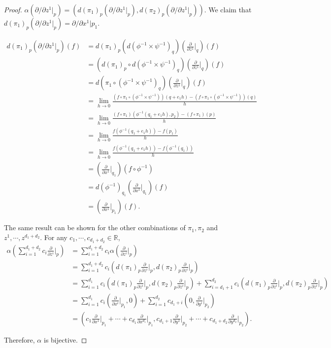\begin{proof}
  $\alpha(\partial / \partial z^1 \vert_p) = (d(\pi_1)_p(\partial/\partial z^1\vert_p), d(\pi_2)_p(\partial/\partial z^1\vert_p))$.
  We claim that $d(\pi_1)_p(\partial / \partial z^1 \vert_p) = \partial / \partial x^1 \vert p_1$.

  \begin{align*}
    d(\pi_1)_p(\partial / \partial z^1 \vert_p)(f)
      &= d(\pi_1)_p(d(\phi^{-1} \times \psi^{-1})_q)(\frac{\partial}{\partial z^1}\vert_q) (f)\\
      &= (d(\pi_1)_p \circ d(\phi^{-1} \times \psi^{-1})_q)(\frac{\partial}{\partial z^1}\vert_q) (f)\\
      &= d(\pi_1 \circ (\phi^{-1} \times \psi^{-1})_q)(\frac{\partial}{\partial z^1}\vert_q) (f)\\
      &= \lim_{h \rightarrow 0} \frac{(f \circ \pi_1 \circ (\phi^{-1} \times \psi^{-1}))(q + e_1h) - (f \circ \pi_1 \circ (\phi^{-1} \times \psi^{-1}))(q)}{h} \\
      &= \lim_{h \rightarrow 0} \frac{(f \circ \pi_1)(\phi^{-1}(q_1 + e_1h), p_2) - (f \circ \pi_1)(p)}{h} \\
      &= \lim_{h \rightarrow 0} \frac{f(\phi^{-1}(q_1 + e_1h)) - f(p_1)}{h} \\
      &= \lim_{h \rightarrow 0} \frac{f(\phi^{-1}(q_1 + e_1h)) - f(\phi^{-1}(q_1))}{h} \\
      &= (\frac{\partial}{\partial x^1}\vert_{q_1})(f \circ \phi^{-1}) \\
      &= d(\phi^{-1})_{q_1}(\frac{\partial}{\partial x^1}\vert_{q_1})(f) \\
      &= (\frac{\partial}{\partial x^1}\vert_{p_1})(f).
  \end{align*}

  The same result can be shown for the other combinations of $\pi_1, \pi_2$ and $z^1, \cdots, z^{d_1 + d_2}$.
  For any $c_1, \cdots, c_{d_1 + d_2} \in \mathbb{R}$,
  \begin{align*}
    \alpha(\sum_{i=1}^{d_1 + d_2} c_{i}\frac{\partial}{\partial z^{i}}\vert_p)
      &= \sum_{i=1}^{d_1 + d_2} c_i\alpha(\frac{\partial}{\partial z^{i}}\vert_p) \\
      &= \sum_{i=1}^{d_1 + d_2} c_i(d(\pi_1)_p\frac{\partial}{\partial z^{i}}\vert_p, d(\pi_2)_p\frac{\partial}{\partial z^i}\vert_p) \\
      &= \sum_{i=1}^{d_1} c_i(d(\pi_1)_p\frac{\partial}{\partial z^{i}}\vert_p, d(\pi_2)_p\frac{\partial}{\partial z^i}\vert_p) 
         + \sum_{i=d_1 + 1}^{d_2} c_i(d(\pi_1)_p\frac{\partial}{\partial z^{i}}\vert_p, d(\pi_2)_p\frac{\partial}{\partial z^i}\vert_p) \\
      &= \sum_{i=1}^{d_1} c_i(\frac{\partial}{\partial x^i} \vert_{p_1}, 0)
         + \sum_{i=1}^{d_2} c_{d_1 + i}(0, \frac{\partial}{\partial y^i} \vert_{p_2}) \\
      &= (c_1\frac{\partial}{\partial x^1}\vert_{p_1} + \cdots + c_{d_1}\frac{\partial}{\partial x^{d_1}}\vert_{p_1},
          c_{d_1 + 1}\frac{\partial}{\partial y^{1}}\vert_{p_2} + \cdots + c_{d_1 + d_2}\frac{\partial}{\partial y^{d_2}}\vert_{p_2}).
  \end{align*}

  Therefore, $\alpha$ is bijective.
\end{proof}

